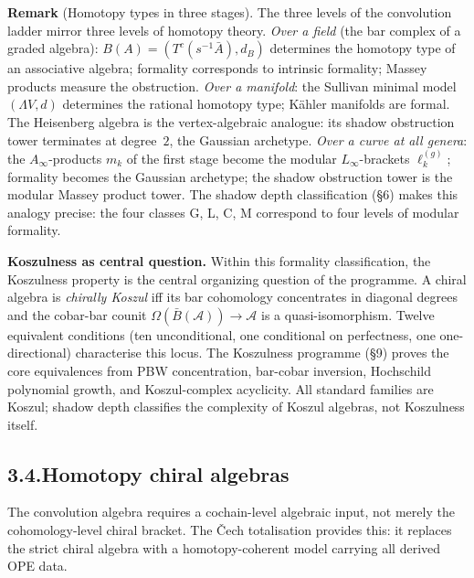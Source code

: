 \documentclass[11pt,reqno]{amsart}
\theoremstyle{definition}
\theoremstyle{remark}
\providecommand{\cA}{\mathcal{A}}
\providecommand{\barB}{\bar{B}}
\numberwithin{equation}{section}
\begin{document}
\medskip
\noindent\textbf{Remark} (Homotopy types in three stages). The three
levels of the convolution ladder mirror three levels of homotopy
theory. \emph{Over a field} (the bar complex of a graded algebra):
$B(A)=(T^c(s^{-1}\bar A),d_B)$ determines
the homotopy type of an associative algebra; formality corresponds to
intrinsic formality; Massey products measure the obstruction.
\emph{Over a manifold}: the Sullivan minimal model $(\Lambda V,d)$
determines the rational homotopy type; K\"ahler manifolds are formal.
The Heisenberg algebra is the vertex-algebraic analogue: its shadow
obstruction tower terminates at degree~$2$, the Gaussian archetype.
\emph{Over a curve at all genera}: the $A_\infty$-products $m_k$ of
the first stage become the modular $L_\infty$-brackets $\ell_k^{(g)}$;
formality becomes the Gaussian archetype; the shadow obstruction tower
is the modular Massey product tower. The shadow depth classification
(\S6) makes this analogy precise: the four classes G, L, C, M
correspond to four levels of modular formality.

\medskip
\noindent\textbf{Koszulness as central question.}\enspace
Within this formality classification, the Koszulness property is the
central organizing question of the programme. A chiral algebra is
\emph{chirally Koszul} iff its bar cohomology concentrates in
diagonal degrees and the cobar-bar counit
$\Omega(\barB(\cA))\to\cA$ is a quasi-isomorphism. Twelve equivalent
conditions (ten unconditional, one conditional on perfectness, one
one-directional) characterise this locus. The Koszulness programme
(\S9) proves the core equivalences from PBW concentration, bar-cobar
inversion, Hochschild polynomial growth, and Koszul-complex
acyclicity. All standard families are Koszul; shadow depth classifies
the complexity of Koszul algebras, not Koszulness itself.

\subsection*{3.4.\enspace Homotopy chiral algebras}

The convolution algebra requires a cochain-level algebraic input, not
merely the cohomology-level chiral bracket. The \v Cech totalisation
provides this: it replaces the strict chiral algebra with a
homotopy-coherent model carrying all derived OPE data.
\end{document}
